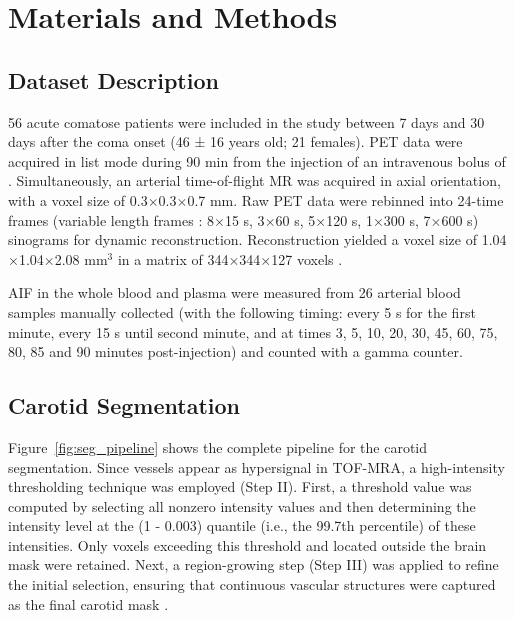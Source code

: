 \chapter{Materials and Methods}

\section{Dataset Description}
56 acute comatose patients were included in the study between 7 days and 30 days after the coma onset (46 ± 16 years old; 21 females).
PET data were acquired in list mode during 90 min from the injection of an intravenous bolus of \fdg.
Simultaneously, an arterial time-of-flight MR was acquired in axial orientation, with a voxel size of 0.3$\times$0.3$\times$0.7 mm.
Raw PET data were rebinned into 24-time frames (variable length frames : 8$\times$15 s, 3$\times$60 s, 5$\times$120 s, 1$\times$300 s, 7$\times$600 s) sinograms for dynamic reconstruction.
Reconstruction yielded a voxel size of 1.04$\times$1.04$\times$2.08 mm$^3$ in a matrix of 344$\times$344$\times$127 voxels .

AIF in the whole blood and plasma were measured from 26 arterial blood samples manually collected (with the following timing: every 5 s for the first minute, every 15 s until second minute, and at times 3, 5, 10, 20, 30, 45, 60, 75, 80, 85 and 90 minutes post-injection) and counted with a gamma counter.

\section{Carotid Segmentation\label{sec:carotid}}
Figure~\ref{fig:seg_pipeline} shows the complete pipeline for the carotid segmentation.
Since vessels appear as hypersignal in TOF-MRA, a high-intensity thresholding technique was employed (Step II).
First, a threshold value was computed by selecting all nonzero intensity values and then determining the intensity level at the (1 - 0.003) quantile (i.e., the 99.7th percentile) of these intensities.
Only voxels exceeding this threshold and located outside the brain mask were retained.
Next, a region-growing step (Step III) was applied to refine the initial selection, ensuring that continuous vascular structures were captured as the final carotid mask \cite{irace2021bayesian}.

